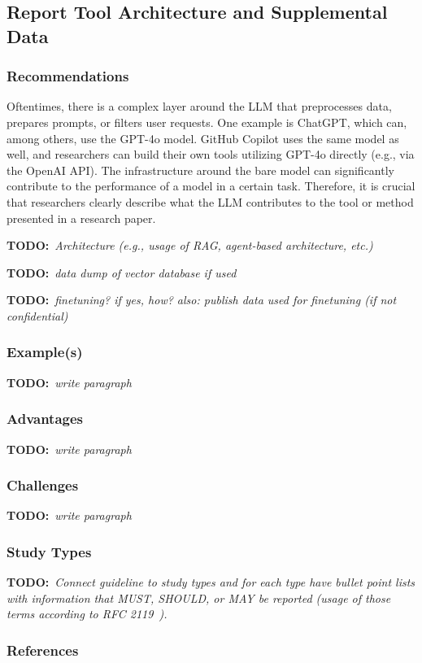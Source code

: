 \documentclass[11pt]{article}
\newcommand{\todo}[1]{{\textbf{TODO:}\ \textit{#1}}} %
\begin{document}
\subsection{Report Tool Architecture and Supplemental Data}

\subsubsection{Recommendations}

Oftentimes, there is a complex layer around the LLM that preprocesses data, prepares prompts, or filters user requests.
One example is ChatGPT, which can, among others, use the GPT-4o model.
GitHub Copilot uses the same model as well, and researchers can build their own tools utilizing GPT-4o directly (e.g., via the OpenAI API).
The infrastructure around the bare model can significantly contribute to the performance of a model in a certain task.
Therefore, it is crucial that researchers clearly describe what the LLM contributes to the tool or method presented in a research paper.

\todo{Architecture (e.g., usage of RAG, agent-based architecture, etc.)}

\todo{data dump of vector database if used}

\todo{finetuning? if yes, how? also: publish data used for finetuning (if not confidential)}


\subsubsection{Example(s)}

\todo{write paragraph}


\subsubsection{Advantages}

\todo{write paragraph}


\subsubsection{Challenges}

\todo{write paragraph}


\subsubsection{Study Types}

\todo{Connect guideline to study types and for each type have bullet point lists with information that MUST, SHOULD, or MAY be reported (usage of those terms according to RFC 2119~\cite{rfc2119}).}


\subsubsection{References}



\end{document}
